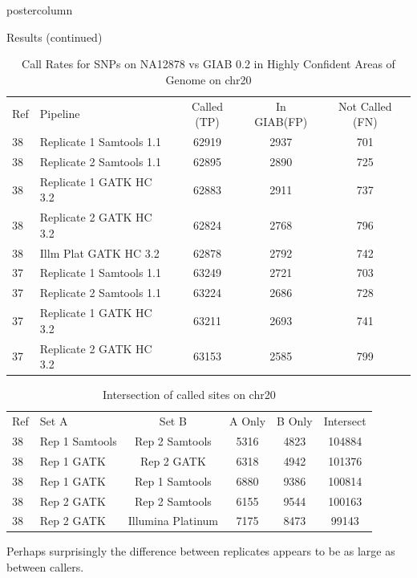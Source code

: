 \documentclass[final]{beamer}
\begin{document}
\begin{frame}{}
\begin{columns}
\begin{column}{.49\textwidth}
\begin{beamercolorbox}[center,wd=\textwidth]{postercolumn}
\begin{minipage}[T]{.95\textwidth}
            \begin{block}{Results (continued)}
            \begin{table}[h]
\begin{tabular}{|l|l|c|c|c|}
\hline
Ref & Pipeline & Called (TP) & In GIAB(FP) & Not Called (FN) \\ \cline{1-5}
38 & Replicate 1 Samtools 1.1 & 62919 & 2937 & 701 \\ \cline{1-5}
38 & Replicate 2 Samtools 1.1 & 62895 & 2890 & 725 \\ \cline{1-5}
38 & Replicate 1 GATK HC 3.2 & 62883 & 2911 & 737 \\ \cline{1-5}
38 & Replicate 2 GATK HC 3.2 & 62824 & 2768 & 796 \\ \cline{1-5}
38 & Illm Plat GATK HC 3.2 & 62878 & 2792 & 742 \\ \cline{1-5}
37 & Replicate 1 Samtools 1.1 & 63249 & 2721 & 703 \\ \cline{1-5}
37 & Replicate 2 Samtools 1.1 & 63224 & 2686 & 728 \\ \cline{1-5}
37 & Replicate 1 GATK HC 3.2 & 63211 & 2693 & 741 \\ \cline{1-5}
37 & Replicate 2 GATK HC 3.2 & 63153 & 2585 & 799 \\ \cline{1-5}
\hline
\end{tabular}
\caption{Call Rates for SNPs on NA12878 vs GIAB 0.2 in Highly Confident Areas of Genome on chr20}
\label{table:2}
\end{table}

            \begin{table}[h]
\begin{tabular}{|l|l|c|c|c|c|}
\hline
Ref & Set A & Set B & A Only & B Only & Intersect \\ \cline{1-6}
38 & Rep 1 Samtools & Rep 2 Samtools & 5316 & 4823 & 104884 \\ \cline{1-6}
38 & Rep 1 GATK & Rep 2 GATK & 6318 & 4942 & 101376 \\ \cline{1-6}
38 & Rep 1 GATK & Rep 1 Samtools&6880&9386&100814 \\ \cline{1-6}
38 & Rep 2 GATK & Rep 2 Samtools&6155&9544&100163 \\ \cline{1-6}
38 & Rep 2 GATK & Illumina Platinum&7175&8473&99143 \\ \cline{1-6}
\end{tabular}
\caption{Intersection of called sites on chr20}
\end{table}

                Perhaps surprisingly the difference between replicates appears to be as large as between callers.
                

\end{block}
\end{minipage}
\end{beamercolorbox}
\end{column}
\end{columns}
\end{frame}
\end{document}

